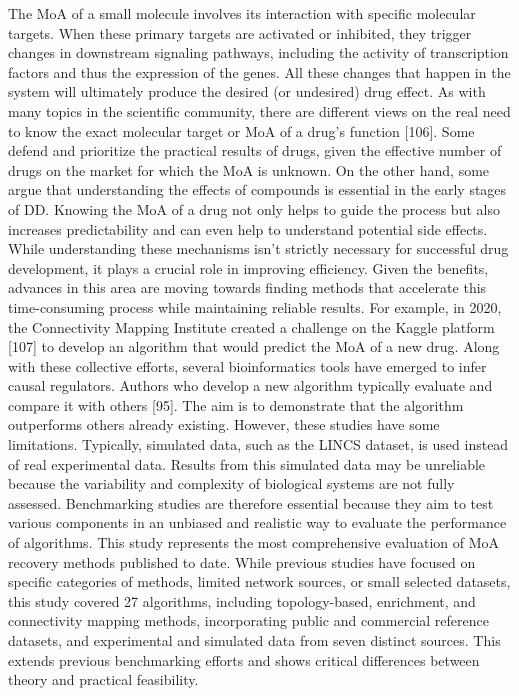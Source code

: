 The MoA of a small molecule involves its interaction with specific molecular targets. When these primary targets are activated or inhibited, they trigger changes in downstream signaling pathways, including the activity of transcription factors and thus the expression of the genes. All these changes that happen in the system will ultimately produce the desired (or undesired) drug effect. As with many topics in the scientific community, there are different views on the real need to know the exact molecular target or MoA of a drug's function [106]. Some defend and prioritize the practical results of drugs, given the effective number of drugs on the market for which the MoA is unknown. On the other hand, some argue that understanding the effects of compounds is essential in the early stages of DD. Knowing the MoA of a drug not only helps to guide the process but also increases predictability and can even help to understand potential side effects. While understanding these mechanisms isn't strictly necessary for successful drug development, it plays a crucial role in improving efficiency. Given the benefits, advances in this area are moving towards finding methods that accelerate this time-consuming process while maintaining reliable results. For example, in 2020, the Connectivity Mapping Institute created a challenge on the Kaggle platform [107] to develop an algorithm that would predict the MoA of a new drug. Along with these collective efforts, several bioinformatics tools have emerged to infer causal regulators. Authors who develop a new algorithm typically evaluate and compare it with others [95]. The aim is to demonstrate that the algorithm outperforms others already existing. However, these studies have some limitations. Typically, simulated data, such as the LINCS dataset, is used instead of real experimental data. Results from this simulated data may be unreliable because the variability and complexity of biological systems are not fully assessed. Benchmarking studies are therefore essential because they aim to test various components in an unbiased and realistic way to evaluate the performance of algorithms. 
This study represents the most comprehensive evaluation of MoA recovery methods published to date. While previous studies have focused on specific categories of methods, limited network sources, or small selected datasets, this study covered 27 algorithms, including topology-based, enrichment, and connectivity mapping methods, incorporating public and commercial reference datasets, and experimental and simulated data from seven distinct sources. This extends previous benchmarking efforts and shows critical differences between theory and practical feasibility.
